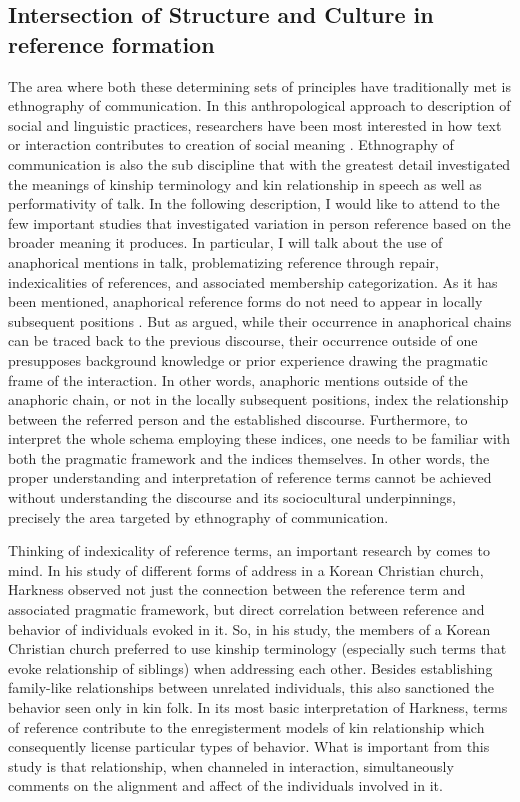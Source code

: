 \documentclass[12pt]{turabian-researchpaper}
\begin{document}
\subsection{Intersection of Structure and Culture in reference formation}
The area where both these determining sets of principles have traditionally met is ethnography of communication. In this anthropological approach to description of social and linguistic practices, researchers have been most interested in how text or interaction contributes to creation of social meaning \parencite{hymes1989}. Ethnography of communication is also the sub discipline that with the greatest detail investigated the meanings of kinship terminology and kin relationship in speech as well as performativity of talk. In the following description, I would like to attend to the few important studies that investigated variation in person reference based on the broader meaning it produces. In particular, I will talk about the use of anaphorical mentions in talk, problematizing reference through repair, indexicalities of references, and associated membership categorization. 
As it has been mentioned, anaphorical reference forms do not need to appear in locally subsequent positions \parencite{schegloff1996}. But as \textcite{hanks2007} argued, while their occurrence in anaphorical chains can be traced back to the previous discourse, their occurrence outside of one presupposes background knowledge or prior experience drawing the pragmatic frame of the interaction. In other words, anaphoric mentions outside of the anaphoric chain, or not in the locally subsequent positions, index the relationship between the referred person and the established discourse. Furthermore, to interpret the whole schema employing these indices, one needs to be familiar with both the pragmatic framework and the indices themselves. In other words, the proper understanding and interpretation of reference terms cannot be achieved without understanding the discourse and its sociocultural underpinnings, precisely the area targeted by ethnography of communication.

Thinking of indexicality of reference terms, an important research by \textcite{harkness2015} comes to mind. In his study of different forms of address in a Korean Christian church, Harkness observed not just the connection between the reference term and associated pragmatic framework, but direct correlation between reference and behavior of individuals evoked in it. So, in his study, the members of a Korean Christian church preferred to use kinship terminology (especially such terms that evoke relationship of siblings) when addressing each other. Besides establishing family-like relationships between unrelated individuals, this also sanctioned the behavior seen only in kin folk. In its most basic interpretation of Harkness, terms of reference contribute to the enregisterment models of kin relationship which consequently license particular types of behavior. What is important from this study is that relationship, when channeled in interaction, simultaneously comments on the alignment and affect of the individuals involved in it. 
\end{document}
